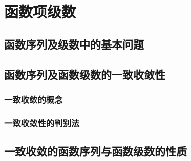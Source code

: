 

\chapter{函数项级数}\label{ch:12}
\section{函数序列及级数中的基本问题}
\section{函数序列及函数级数的一致收敛性}
\subsection{一致收敛的概念}
\subsection{一致收敛性的判别法}
\begin{exercise}
\item
\end{exercise}
\section{一致收敛的函数序列与函数级数的性质}
\begin{exercise}
\item
\end{exercise}
\begin{exercise*}
\item
\end{exercise*}




\endinput
